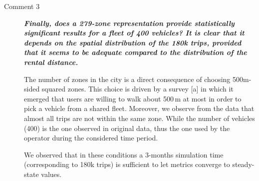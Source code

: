 \documentclass{paper}
\newcommand{\rev}[1]{\textbf{\textit{#1}}}
\newcommand{\ans}[1]{{\color{blue} #1}}
\begin{document}
\begin{description}
\begin{description}


\item[Comment 3] \rev{Finally, does a 279-zone representation provide statistically significant results for a fleet of 400 vehicles? It is clear that it depends on the spatial distribution of the 180k trips, provided that it seems to be adequate compared to the distribution of the rental distance.}\\


\ans{The number of zones in the city is a direct consequence of choosing 500m-sided squared zones. This choice is driven by a survey [a] in which it emerged that users are willing to walk about 500\,m at most in order to pick a vehicle from a shared fleet. Moreover, we observe from the data that almost all trips are not within the same zone. 
While the number of vehicles (400) is the one observed in original data, thus the one used by the operator during the considered time period. 

We observed that in these conditions a 3-months simulation time (corresponding to 180k trips) is sufficient to let metrics converge to steady-state values.}\\



\end{description}
\end{description}
\end{document}
